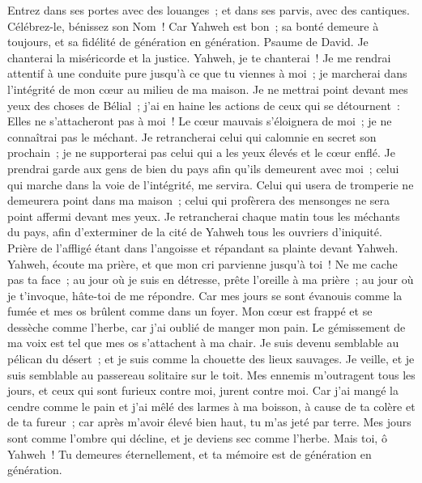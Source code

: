 \begin{multicols}{2}
Entrez dans ses portes avec des louanges~; et dans ses parvis, avec des cantiques. Célébrez-le, bénissez son Nom~!
Car Yahweh est bon~; sa bonté demeure à toujours, et sa fidélité de génération en génération.
\VerseOne{}Psaume de David. Je chanterai la miséricorde et la justice. Yahweh, je te chanterai~!
Je me rendrai attentif à une conduite pure jusqu'à ce que tu viennes à moi~; je marcherai dans l'intégrité de mon cœur au milieu de ma maison.
Je ne mettrai point devant mes yeux des choses de Bélial~; j'ai en haine les actions de ceux qui se détournent~: Elles ne s'attacheront pas à moi~!
Le cœur mauvais s'éloignera de moi~; je ne connaîtrai pas le méchant.
Je retrancherai celui qui calomnie en secret son prochain~; je ne supporterai pas celui qui a les yeux élevés et le cœur enflé.
Je prendrai garde aux gens de bien du pays afin qu'ils demeurent avec moi~; celui qui marche dans la voie de l'intégrité, me servira.
Celui qui usera de tromperie ne demeurera point dans ma maison~; celui qui profèrera des mensonges ne sera point affermi devant mes yeux.
Je retrancherai chaque matin tous les méchants du pays, afin d'exterminer de la cité de Yahweh tous les ouvriers d'iniquité.
\VerseOne{}Prière de l'affligé étant dans l'angoisse et répandant sa plainte devant Yahweh.
Yahweh, écoute ma prière, et que mon cri parvienne jusqu'à toi~!
Ne me cache pas ta face~; au jour où je suis en détresse, prête l'oreille à ma prière~; au jour où je t'invoque, hâte-toi de me répondre.
Car mes jours se sont évanouis comme la fumée et mes os brûlent comme dans un foyer.
Mon cœur est frappé et se dessèche comme l'herbe, car j'ai oublié de manger mon pain.
Le gémissement de ma voix est tel que mes os s'attachent à ma chair.
Je suis devenu semblable au pélican du désert~; et je suis comme la chouette des lieux sauvages.
Je veille, et je suis semblable au passereau solitaire sur le toit.
Mes ennemis m'outragent tous les jours, et ceux qui sont furieux contre moi, jurent contre moi.
Car j'ai mangé la cendre comme le pain et j'ai mêlé des larmes à ma boisson,
à cause de ta colère et de ta fureur~; car après m'avoir élevé bien haut, tu m'as jeté par terre.
Mes jours sont comme l'ombre qui décline, et je deviens sec comme l'herbe.
Mais toi, ô Yahweh~! Tu demeures éternellement, et ta mémoire est de génération en génération.

\end{multicols}

